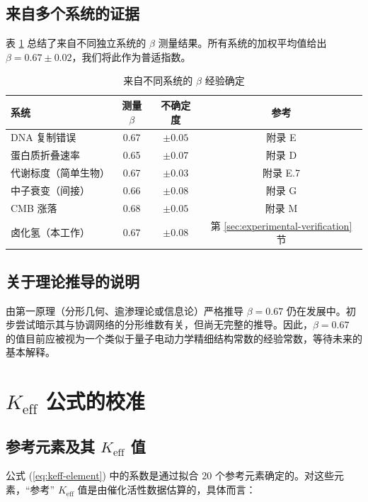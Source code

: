 \documentclass[11pt,a4paper]{article}
\newcommand{\Keff}{K_{\mathrm{eff}}}
\begin{document}
	\subsection{来自多个系统的证据}
	
	表 \ref{tab:beta-empirical} 总结了来自不同独立系统的 $\beta$ 测量结果。所有系统的加权平均值给出 $\beta = 0.67 \pm 0.02$，我们将此作为普适指数。
	
	\begin{table}[htbp]
		\centering
		\caption{来自不同系统的 $\beta$ 经验确定}
		\label{tab:beta-empirical}
		\begin{tabular}{lccc}
			\toprule
			系统 & 测量 $\beta$ & 不确定度 & 参考 \\
			\midrule
			DNA 复制错误 & 0.67 & $\pm 0.05$ & 附录 E \\
			蛋白质折叠速率 & 0.65 & $\pm 0.07$ & 附录 D \\
			代谢标度（简单生物） & 0.67 & $\pm 0.03$ & 附录 E.7 \\
			中子衰变（间接） & 0.66 & $\pm 0.08$ & 附录 G \\
			CMB 涨落 & 0.68 & $\pm 0.05$ & 附录 M \\
			卤化氢（本工作） & 0.67 & $\pm 0.08$ & 第 \ref{sec:experimental-verification} 节 \\
			\bottomrule
		\end{tabular}
	\end{table}
	
	\subsection{关于理论推导的说明}
	
	由第一原理（分形几何、逾渗理论或信息论）严格推导 $\beta = 0.67$ 仍在发展中。初步尝试暗示其与协调网络的分形维数有关，但尚无完整的推导。因此，$\beta = 0.67$ 的值目前应被视为一个类似于量子电动力学精细结构常数的经验常数，等待未来的基本解释。
	
	\section{$\Keff$ 公式的校准}
	\label{sec:calibration}
	
	\subsection{参考元素及其 $\Keff$ 值}
	
	公式 (\ref{eq:keff-element}) 中的系数是通过拟合 20 个参考元素确定的。对这些元素，“参考” $\Keff$ 值是由催化活性数据估算的，具体而言：
	
\end{document}
